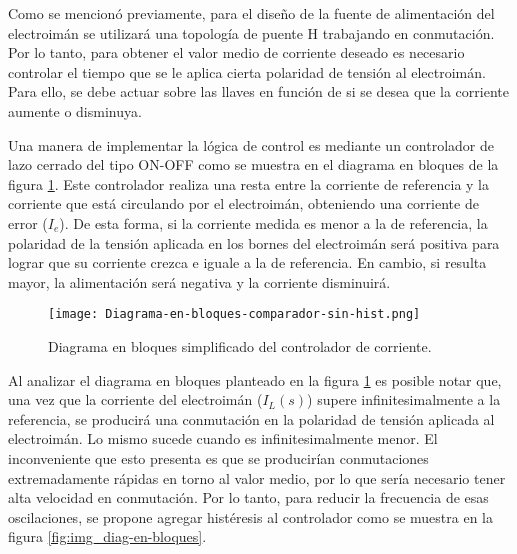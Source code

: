 Como se mencionó previamente, para el diseño de la fuente de alimentación del electroimán se utilizará una topología de puente H trabajando en conmutación. Por lo tanto, para obtener el valor medio de corriente deseado es necesario controlar el tiempo que se le aplica cierta polaridad de tensión al electroimán. Para ello, se debe actuar sobre las llaves en función de si se desea que la corriente aumente o disminuya.

Una manera de implementar la lógica de control es mediante un controlador de lazo cerrado del tipo ON-OFF como se muestra en el diagrama en bloques de la figura \ref{fig:img_diag-en-bloques-comparador-sin-hist}. Este controlador realiza una resta entre la corriente de referencia y la corriente que está circulando por el electroimán, obteniendo una corriente de error ($I_e$). De esta forma, si la corriente medida es menor a la de referencia, la polaridad de la tensión aplicada en los bornes del electroimán será positiva para lograr que su corriente crezca e iguale a la de referencia. En cambio, si resulta mayor, la alimentación será negativa y la corriente disminuirá.

\begin{figure}[H]
	\centering
	\texttt{[image: Diagrama-en-bloques-comparador-sin-hist.png]}
	\caption{Diagrama en bloques simplificado del controlador de corriente.}
	\label{fig:img_diag-en-bloques-comparador-sin-hist}
\end{figure}







Al analizar el diagrama en bloques planteado en la figura \ref{fig:img_diag-en-bloques-comparador-sin-hist} es posible notar que, una vez que la corriente del electroimán ($I_{L}(s)$) supere infinitesimalmente a la referencia, se producirá una conmutación en la polaridad de tensión aplicada al electroimán. Lo mismo sucede cuando es infinitesimalmente menor. El inconveniente que esto presenta es que se producirían conmutaciones extremadamente rápidas en torno al valor medio, por lo que sería necesario tener alta velocidad en conmutación. Por lo tanto, para reducir la frecuencia de esas oscilaciones, se propone agregar histéresis al controlador como se muestra en la figura \ref{fig:img_diag-en-bloques}.

